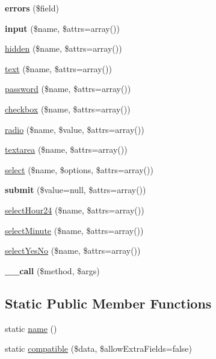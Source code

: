 \begin{DoxyCompactItemize}
\item 
\hypertarget{classForm_a926ffa6cfcb6b0df448fdb3d084f3a85}{
{\bfseries errors} (\$field)}
\label{classForm_a926ffa6cfcb6b0df448fdb3d084f3a85}

\item 
\hypertarget{classForm_ad346f6535dce3b737a354ec158fc56b8}{
{\bfseries input} (\$name, \$attrs=array())}
\label{classForm_ad346f6535dce3b737a354ec158fc56b8}

\item 
\hyperlink{classForm_a3c7226192b6c4a6d098db567dc00fba1}{hidden} (\$name, \$attrs=array())
\item 
\hyperlink{classForm_a7856398bee38d7cc0a5e805079651725}{text} (\$name, \$attrs=array())
\item 
\hyperlink{classForm_a88fa3b1b21917530621c45e121c6e273}{password} (\$name, \$attrs=array())
\item 
\hyperlink{classForm_ab5a5c2d036613181c1fd69356bf9ac7f}{checkbox} (\$name, \$attrs=array())
\item 
\hyperlink{classForm_a3394ae873b4192b6f3827dae49bb3ee1}{radio} (\$name, \$value, \$attrs=array())
\item 
\hyperlink{classForm_a2ce53f56957c430f52afed0f7a8b900f}{textarea} (\$name, \$attrs=array())
\item 
\hyperlink{classForm_a4721ca44be121370629b04e364c70a41}{select} (\$name, \$options, \$attrs=array())
\item 
\hypertarget{classForm_a88892a17eb246d0309419b7289be9ceb}{
{\bfseries submit} (\$value=null, \$attrs=array())}
\label{classForm_a88892a17eb246d0309419b7289be9ceb}

\item 
\hyperlink{classForm_a66e9d055a0daa51aa1c5b4dd62f3f82b}{selectHour24} (\$name, \$attrs=array())
\item 
\hyperlink{classForm_ae1d9a2ca2ec79f9cf872014397447273}{selectMinute} (\$name, \$attrs=array())
\item 
\hyperlink{classForm_aea60ffaa701fea429e51ceddb3712298}{selectYesNo} (\$name, \$attrs=array())
\item 
\hypertarget{classForm_ab47a12ae2f9f2cb205de386aa259bbc8}{
{\bfseries \_\-\_\-call} (\$method, \$args)}
\label{classForm_ab47a12ae2f9f2cb205de386aa259bbc8}

\end{DoxyCompactItemize}
\subsection*{Static Public Member Functions}
\begin{DoxyCompactItemize}
\item 
static \hyperlink{classForm_afe6750a98993c81da710af555a6ec3f7}{name} ()
\item 
static \hyperlink{classForm_a51c909fa03f961faadc70d1f8121e656}{compatible} (\$data, \$allowExtraFields=false)
\end{DoxyCompactItemize}
